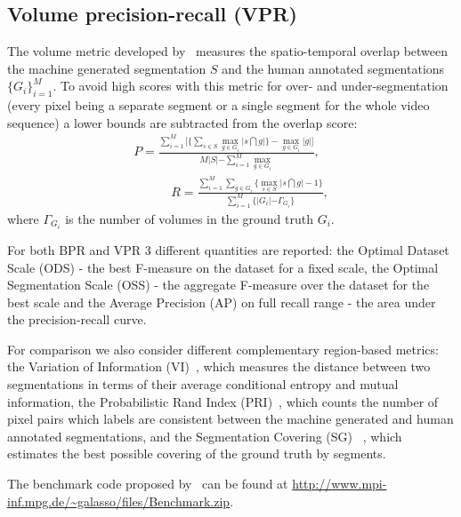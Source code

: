 \subsection{Volume precision-recall (VPR)}
The volume metric developed by~\cite{Galasso13} measures the spatio-temporal overlap between the machine generated segmentation $S$ and the human annotated segmentations $\{ G_i\}_{i=1}^M$. 
To avoid high scores with this metric for over- and under-segmentation (every pixel being a separate segment or a single segment for the whole video sequence) a lower bounds are subtracted from the overlap score: 
\begin{equation*}
\begin{aligned}
 P=\frac{ \sum_{i=1}^M \bigl [ \{ \sum_{s\in S} \max_{g \in G_i} \lvert s \bigcap g \rvert\} - \max_{g \in G_i} \rvert g\lvert \bigr ]}{M\rvert S \lvert - \sum_{i=1}^M \max_{g \in G_i}},\\
\qquad
\quad
 R =\frac{ \sum_{i=1}^M  \sum_{g\in G_i} \{\max_{s \in S} \lvert s\bigcap g \rvert-1 \}}{\sum_{i=1}^M \{ \rvert G_i \lvert - \Gamma_{G_i} \}},
\end{aligned}
\end{equation*}
where $\Gamma_{G_i}$ is the number of volumes in the ground truth $G_i$.

For both BPR and VPR  3 different quantities are reported: the Optimal Dataset Scale (ODS) - the best F-measure on the dataset for a fixed scale, the Optimal Segmentation Scale (OSS) - the aggregate F-measure over the dataset for 
the best scale and the Average Precision (AP) on full recall range - the area under the precision-recall curve. %

For comparison we also consider different complementary region-based metrics: the Variation of Information (VI)~\cite{Meila05}, which measures the distance between two segmentations in terms of their average conditional entropy and mutual information, the 
Probabilistic Rand Index (PRI)~\cite{rand1971, UnnikrishnanPH07}, which counts the number of pixel pairs which labels are consistent between the machine generated and human annotated segmentations, and the Segmentation Covering (SG)
~\cite{Arbelaez09}, which estimates the best possible covering of the ground truth by segments.  

The benchmark code proposed by~\cite{Galasso13} can be found at  \url{http://www.mpi-inf.mpg.de/~galasso/files/Benchmark.zip}.
